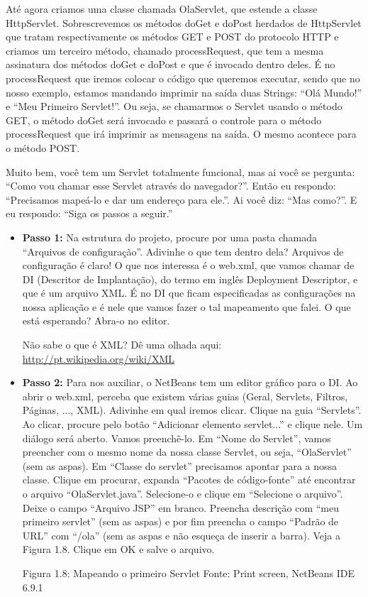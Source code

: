 Até agora criamos uma classe chamada OlaServlet, que estende a classe HttpServlet. Sobrescrevemos os métodos doGet e doPost herdados de HttpServlet que tratam respectivamente os métodos GET e POST do protocolo HTTP e criamos um terceiro método, chamado processRequest, que tem a mesma assinatura dos métodos doGet e doPost e que é invocado dentro deles. É no processRequest que iremos colocar o código que queremos executar, sendo que no nosso exemplo, estamos mandando imprimir na saída duas Strings: ``Olá Mundo!'' e ``Meu Primeiro Servlet!''. Ou seja, se chamarmos o Servlet usando o método GET, o método doGet será invocado e passará o controle para o método processRequest que irá imprimir as mensagens na saída. O mesmo acontece para o método POST.

Muito bem, você tem um Servlet totalmente funcional, mas ai você se pergunta: ``Como vou chamar esse Servlet através do navegador?''. Então eu respondo: ``Precisamos mapeá-lo e dar um endereço para ele.''. Ai você diz: ``Mas como?''. E eu respondo: ``Siga os passos a seguir.''

\begin{itemize}

    \item \textbf{Passo 1:} Na estrutura do projeto, procure por uma pasta chamada ``Arquivos de configuração''. Adivinhe o que tem dentro dela? Arquivos de configuração é claro! O que nos interessa é o web.xml, que vamos chamar de DI (Descritor de Implantação), do termo em inglês Deployment Descriptor, e que é um arquivo XML. É no DI que ficam especificadas as configurações na nossa aplicação e é nele que vamos fazer o tal mapeamento que falei. O que está esperando? Abra-o no editor. 
    
    \begin{saibaMais}
        Não sabe o que é XML? Dê uma olhada aqui: \url{http://pt.wikipedia.org/wiki/XML}
    \end{saibaMais}
    
    \item \textbf{Passo 2:} Para nos auxiliar, o NetBeans tem um editor gráfico para o DI. Ao abrir o web.xml, perceba que existem várias guias (Geral, Servlets, Filtros, Páginas, ..., XML). Adivinhe em qual iremos clicar. Clique na guia ``Servlets''. Ao clicar, procure pelo botão ``Adicionar elemento servlet...'' e clique nele. Um diálogo será aberto. Vamos preenchê-lo. Em ``Nome do Servlet'', vamos preencher com o mesmo nome da nossa classe Servlet, ou seja, ``OlaServlet'' (sem as aspas). Em ``Classe do servlet'' precisamos apontar para a nossa classe. Clique em procurar, expanda ``Pacotes de código-fonte'' até encontrar o arquivo ``OlaServlet.java''. Selecione-o e clique em ``Selecione o arquivo''. Deixe o campo ``Arquivo JSP'' em branco. Preencha descrição com ``meu primeiro servlet'' (sem as aspas) e por fim preencha o campo ``Padrão de URL'' com ``/ola'' (sem as aspas e não esqueça de inserir a barra). Veja a Figura 1.8. Clique em OK e salve o arquivo.
    
    Figura 1.8: Mapeando o primeiro Servlet
    Fonte: Print screen, NetBeans IDE 6.9.1
    
\end{itemize}

